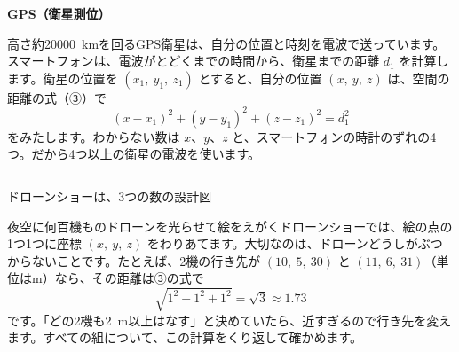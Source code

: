 \begin{butsuri}
\noindent\begin{minipage}[c]{0.66\linewidth}
\textbf{GPS（衛星測位）}\par\noindent 高さ約\qty{20000}{km}を回るGPS衛星は、自分の位置と時刻を電波で送っています。スマートフォンは、電波がとどくまでの時間から、衛星までの距離 $d_1$ を計算します。衛星の位置を $(x_1,\ y_1,\ z_1)$ とすると、自分の位置 $(x,\ y,\ z)$ は、空間の距離の式（③）で
\[ (x-x_1)^2+(y-y_1)^2+(z-z_1)^2=d_1^2 \]
をみたします。わからない数は $x$、$y$、$z$ と、スマートフォンの時計のずれの4つ。だから4つ以上の衛星の電波を使います。
\end{minipage}\hfill
\begin{minipage}[c]{0.31\linewidth}
\centering
{}
\end{minipage}
\end{butsuri}

\begin{column}{ドローンショーは、3つの数の設計図}
\noindent\begin{minipage}[c]{0.66\linewidth}
夜空に何百機ものドローンを光らせて絵をえがくドローンショーでは、絵の点の1つ1つに座標 $(x,\ y,\ z)$ をわりあてます。大切なのは、ドローンどうしがぶつからないことです。たとえば、2機の行き先が $(10,\ 5,\ 30)$ と $(11,\ 6,\ 31)$（単位はm）なら、その距離は③の式で
\[ \sqrt{1^2+1^2+1^2}=\sqrt3\approx1.73 \]
です。「どの2機も\qty{2}{m}以上はなす」と決めていたら、近すぎるので行き先を変えます。すべての組について、この計算をくり返して確かめます。
\end{minipage}\hfill
\begin{minipage}[c]{0.3\linewidth}
\centering
{}
\end{minipage}
\end{column}


